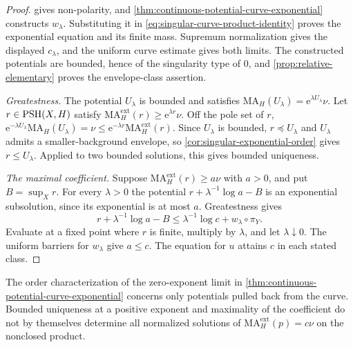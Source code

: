 \begin{proof}
 gives non-polarity, and \cref{thm:continuous-potential-curve-exponential} constructs $w_\lambda$. Substituting it in \eqref{eq:singular-curve-product-identity} proves the exponential equation and its finite mass. Supremum normalization gives the displayed $c_\lambda$, and the uniform curve estimate gives both limits. The constructed potentials are bounded, hence of the singularity type of $0$, and \cref{prop:relative-elementary} proves the envelope-class assertion.

\emph{Greatestness.} The potential $U_\lambda$ is bounded and satisfies $\mathrm{MA}_H(U_\lambda)=\mathrm e^{\lambda U_\lambda}\nu$. Let $r\in\mathrm{PSH}(X,H)$ satisfy $\mathrm{MA}^{\mathrm{ext}}_H(r)\geq\mathrm e^{\lambda r}\nu$. Off the pole set of $r$, $\mathrm e^{-\lambda U_\lambda}\mathrm{MA}_H(U_\lambda)=\nu\leq\mathrm e^{-\lambda r}\mathrm{MA}^{\mathrm{ext}}_H(r)$. Since $U_\lambda$ is bounded, $r\preceq U_\lambda$ and $U_\lambda$ admits a smaller-background envelope, so \cref{cor:singular-exponential-order} gives $r\leq U_\lambda$. Applied to two bounded solutions, this gives bounded uniqueness.

\emph{The maximal coefficient.} Suppose $\mathrm{MA}^{\mathrm{ext}}_H(r)\geq a\nu$ with $a>0$, and put $B=\sup_Xr$. For every $\lambda>0$ the potential $r+\lambda^{-1}\log a-B$ is an exponential subsolution, since its exponential is at most $a$. Greatestness gives
\[
 r+\lambda^{-1}\log a-B
 \leq\lambda^{-1}\log c+w_\lambda\circ\pi_Y.
\]
Evaluate at a fixed point where $r$ is finite, multiply by $\lambda$, and let $\lambda\downarrow0$. The uniform barriers for $w_\lambda$ give $a\leq c$. The equation for $u$ attains $c$ in each stated class.
\end{proof}

The order characterization of the zero-exponent limit in \cref{thm:continuous-potential-curve-exponential} concerns only potentials pulled back from the curve. Bounded uniqueness at a positive exponent and maximality of the coefficient do not by themselves determine all normalized solutions of $\mathrm{MA}^{\mathrm{ext}}_H(p)=c\nu$ on the nonclosed product.


